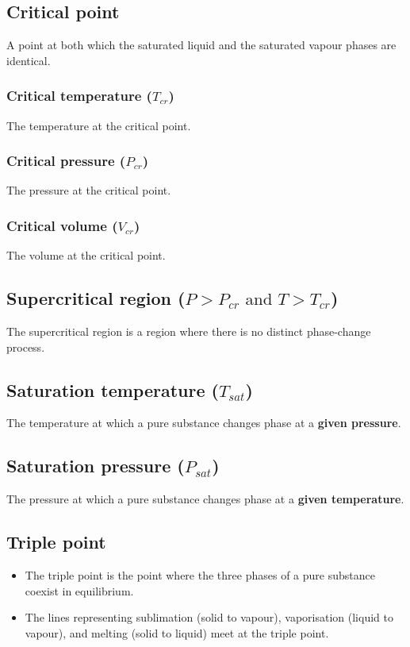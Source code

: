 \documentclass[11pt]{article}
\begin{document}
\subsection{Critical point}
\label{sec:org96762ec}
A point at both which the saturated liquid and the saturated vapour phases are identical.

\subsubsection{Critical temperature (\(T_{cr}\))}
\label{sec:org61cd489}
The temperature at the critical point.

\subsubsection{Critical pressure (\(P_{cr}\))}
\label{sec:orgcfae6d7}
The pressure at the critical point.

\subsubsection{Critical volume (\(V_{cr}\))}
\label{sec:orga6036ef}
The volume at the critical point.

\subsection{Supercritical region (\(P > P_{cr} \text{ and } T > T_{cr}\))}
\label{sec:org166a337}
The supercritical region is a region where there is no distinct phase-change process.

\subsection{Saturation temperature (\(T_{sat}\))}
\label{sec:orgf837494}
The temperature at which a pure substance changes phase at a \textbf{given pressure}.

\subsection{Saturation pressure (\(P_{sat}\))}
\label{sec:orgb6ef300}
The pressure at which a pure substance changes phase at a \textbf{given temperature}.

\subsection{Triple point}
\label{sec:org74a00fd}
\begin{itemize}
\item The triple point is the point where the three phases of a pure substance coexist in equilibrium.
\item The lines representing sublimation (solid to vapour), vaporisation (liquid to vapour), and melting (solid to liquid) meet at the triple point.
\end{itemize}
\end{document}
